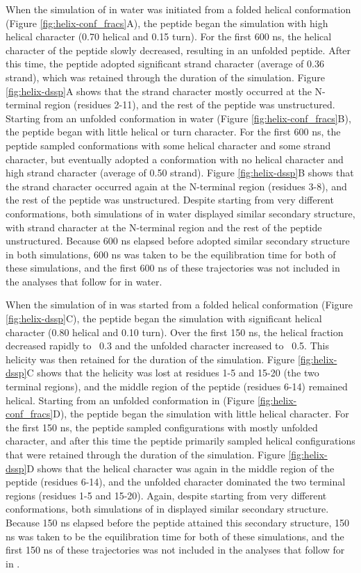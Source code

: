 When the simulation of \pep{} in water was initiated from a folded helical conformation (Figure \ref{fig:helix-conf_fracs}A), the peptide began the simulation with high helical character (0.70 helical and 0.15 turn). 
For the first 600 ns, the helical character of the peptide slowly decreased, resulting in an unfolded peptide. 
After this time, the peptide adopted significant strand character (average of 0.36 strand), which was retained through the duration of the simulation. 
Figure \ref{fig:helix-dssp}A shows that the strand character mostly occurred at the N-terminal region (residues 2-11), and the rest of the peptide was unstructured. 
Starting from an unfolded conformation in water (Figure \ref{fig:helix-conf_fracs}B), the peptide began with little helical or turn character. 
For the first 600 ns, the peptide sampled conformations with some helical character and some strand character, but eventually adopted a conformation with no helical character and high strand character (average of 0.50 strand). 
Figure \ref{fig:helix-dssp}B shows that the strand character occurred again at the N-terminal region (residues 3-8), and the rest of the peptide was unstructured. 
Despite starting from very different conformations, both simulations of \pep{} in water displayed similar secondary structure, with strand character at the N-terminal region and the rest of the peptide unstructured. 
Because 600 ns elapsed before \pep{} adopted similar secondary structure in both simulations, 600 ns was taken to be the equilibration time for both of these simulations, and the first 600 ns of these trajectories was not included in the analyses that follow for \pep{} in water.

When the simulation of \pep{} in \tbawat{} was started from a folded helical conformation (Figure \ref{fig:helix-dssp}C), the peptide began the simulation with significant helical character (0.80 helical and 0.10 turn). 
Over the first 150 ns, the helical fraction decreased rapidly to ~0.3 and the unfolded character increased to ~0.5. 
This helicity was then retained for the duration of the simulation. 
Figure \ref{fig:helix-dssp}C shows that the helicity was lost at residues 1-5 and 15-20 (the two terminal regions), and the middle region of the peptide (residues 6-14) remained helical. 
Starting from an unfolded conformation in \tbawat{} (Figure \ref{fig:helix-conf_fracs}D), the peptide began the simulation with little helical character. 
For the first 150 ns, the peptide sampled configurations with mostly unfolded character, and after this time the peptide primarily sampled helical configurations that were retained through the duration of the simulation. 
Figure \ref{fig:helix-dssp}D shows that the helical character was again in the middle region of the peptide (residues 6-14), and the unfolded character dominated the two terminal regions (residues 1-5 and 15-20). 
Again, despite starting from very different conformations, both simulations of \pep{} in \tbawat{} displayed similar secondary structure. 
Because 150 ns elapsed before the peptide attained this secondary structure, 150 ns was taken to be the equilibration time for both of these simulations, and the first 150 ns of these trajectories was not included in the analyses that follow for \pep{} in \tbawat{}. 

